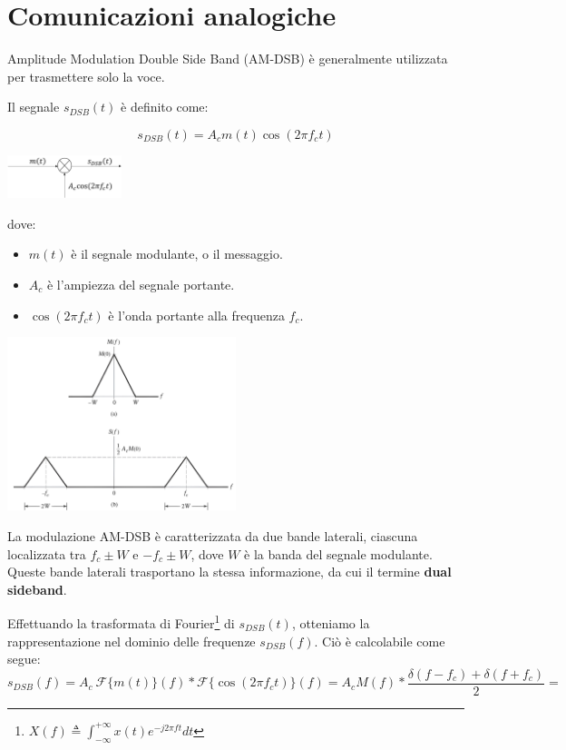 \section*{Comunicazioni analogiche}

Amplitude Modulation Double Side Band (AM-DSB) è generalmente utilizzata per trasmettere solo la voce.


Il segnale \( s_{DSB}(t) \) è definito come:

\begin{equation*}
    s_{DSB}(t) = A_c m(t) \cos(2\pi f_c t)
\end{equation*}

\begin{center}
    \includegraphics[width=0.25\textwidth]{imgs/analog_pam_trasmitter.png}
\end{center}


dove:
\begin{itemize}
    \item \( m(t) \) è il segnale modulante, o il messaggio.
    \item \( A_c \) è l'ampiezza del segnale portante.
    \item \( \cos(2\pi f_c t) \) è l'onda portante alla frequenza \( f_c \).
\end{itemize}

\begin{center}
    \includegraphics[width=0.5\textwidth]{imgs/dsb.jpg}
\end{center}


La modulazione AM-DSB è caratterizzata da due bande laterali, ciascuna localizzata tra \( f_c \pm W \) e \( -f_c \pm W \), dove \( W \) è la banda del segnale modulante. Queste bande laterali trasportano la stessa informazione, da cui il termine \textbf{dual sideband}.

Effettuando la trasformata di Fourier\footnote{$X(f) \triangleq \int_{-\infty}^{+\infty} x(t) e^{-j2\pi ft} dt$} di \( s_{DSB}(t) \), otteniamo la rappresentazione nel dominio delle frequenze \( s_{DSB}(f) \). Ciò è calcolabile come segue:
\[
    s_{DSB}(f) = A_c \ \mathcal{F}\{m(t)\} (f)  \ast \mathcal{F}\{\cos(2\pi f_c t) \}(f) = A_c M(f) \ast \frac{\delta(f - f_c) + \delta(f + f_c)}{2} =
\]

